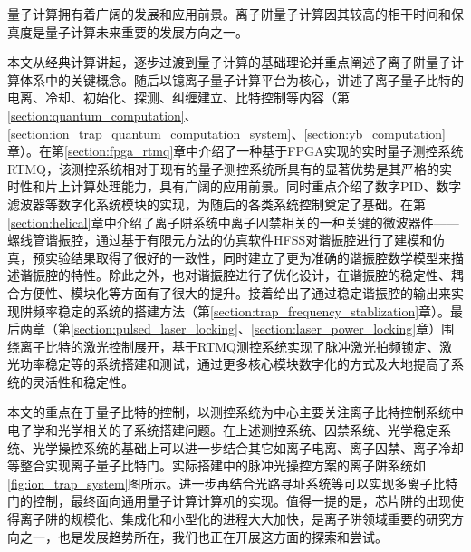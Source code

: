 
\begin{conclusion}

量子计算拥有着广阔的发展和应用前景。离子阱量子计算因其较高的相干时间和保真度是量子计算未来重要的发展方向之一。

本文从经典计算讲起，逐步过渡到量子计算的基础理论并重点阐述了离子阱量子计算体系中的关键概念。随后以镱离子量子计算平台为核心，讲述了离子量子比特的电离、冷却、初始化、探测、纠缠建立、比特控制等内容（第\ref{section:quantum_computation}、\ref{section:ion_trap_quantum_computation_system}、\ref{section:yb_computation}章）。在第\ref{section:fpga_rtmq}章中介绍了一种基于FPGA实现的实时量子测控系统RTMQ，该测控系统相对于现有的量子测控系统所具有的显著优势是其严格的实时性和片上计算处理能力，具有广阔的应用前景。同时重点介绍了数字PID、数字滤波器等数字化系统模块的实现，为随后的各类系统控制奠定了基础。在第\ref{section:helical}章中介绍了离子阱系统中离子囚禁相关的一种关键的微波器件——螺线管谐振腔，通过基于有限元方法的仿真软件HFSS对谐振腔进行了建模和仿真，预实验结果取得了很好的一致性，同时建立了更为准确的谐振腔数学模型来描述谐振腔的特性。除此之外，也对谐振腔进行了优化设计，在谐振腔的稳定性、耦合方便性、模块化等方面有了很大的提升。接着给出了通过稳定谐振腔的输出来实现阱频率稳定的系统的搭建方法（第\ref{section:trap_frequency_stablization}章）。最后两章（第\ref{section:pulsed_laser_locking}、\ref{section:laser_power_locking}章）围绕离子比特的激光控制展开，基于RTMQ测控系统实现了脉冲激光拍频锁定、激光功率稳定等的系统搭建和测试，通过更多核心模块数字化的方式及大地提高了系统的灵活性和稳定性。

本文的重点在于量子比特的控制，以测控系统为中心主要关注离子比特控制系统中电子学和光学相关的子系统搭建问题。在上述测控系统、囚禁系统、光学稳定系统、光学操控系统的基础上可以进一步结合其它如离子电离、离子囚禁、离子冷却等整合实现离子量子比特门。实际搭建中的脉冲光操控方案的离子阱系统如\ref{fig:ion_trap_system}图所示。进一步再结合光路寻址系统等可以实现多离子比特门的控制，最终面向通用量子计算计算机的实现。值得一提的是，芯片阱的出现使得离子阱的规模化、集成化和小型化的进程大大加快，是离子阱领域重要的研究方向之一，也是发展趋势所在，我们也正在开展这方面的探索和尝试。



\end{conclusion}


